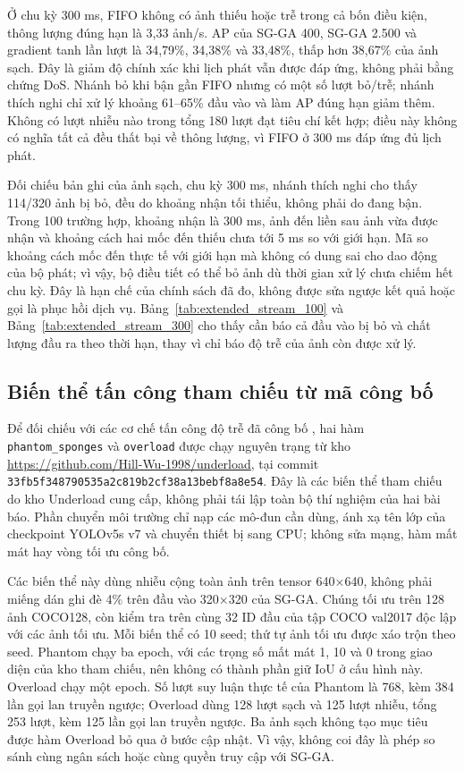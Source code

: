 \documentclass[a4paper,fleqn]{cas-dc}
\begin{document}
Ở chu kỳ 300 ms, FIFO không có ảnh thiếu hoặc trễ trong cả bốn điều kiện, thông lượng đúng hạn là 3,33 ảnh/s. AP của SG-GA 400, SG-GA 2.500 và gradient tanh lần lượt là 34,79\%, 34,38\% và 33,48\%, thấp hơn 38,67\% của ảnh sạch. Đây là giảm độ chính xác khi lịch phát vẫn được đáp ứng, không phải bằng chứng DoS. Nhánh bỏ khi bận gần FIFO nhưng có một số lượt bỏ/trễ; nhánh thích nghi chỉ xử lý khoảng 61--65\% đầu vào và làm AP đúng hạn giảm thêm. Không có lượt nhiễu nào trong tổng 180 lượt đạt tiêu chí kết hợp; điều này không có nghĩa tất cả đều thất bại về thông lượng, vì FIFO ở 300 ms đáp ứng đủ lịch phát.

Đối chiếu bản ghi của ảnh sạch, chu kỳ 300 ms, nhánh thích nghi cho thấy 114/320 ảnh bị bỏ, đều do khoảng nhận tối thiểu, không phải do đang bận. Trong 100 trường hợp, khoảng nhận là 300 ms, ảnh đến liền sau ảnh vừa được nhận và khoảng cách hai mốc đến thiếu chưa tới 5 ms so với giới hạn. Mã so khoảng cách mốc đến thực tế với giới hạn mà không có dung sai cho dao động của bộ phát; vì vậy, bộ điều tiết có thể bỏ ảnh dù thời gian xử lý chưa chiếm hết chu kỳ. Đây là hạn chế của chính sách đã đo, không được sửa ngược kết quả hoặc gọi là phục hồi dịch vụ. Bảng~\ref{tab:extended_stream_100} và Bảng~\ref{tab:extended_stream_300} cho thấy cần báo cả đầu vào bị bỏ và chất lượng đầu ra theo thời hạn, thay vì chỉ báo độ trễ của ảnh còn được xử lý.


\subsection{Biến thể tấn công tham chiếu từ mã công bố}
\label{sec:extended_reference}

Để đối chiếu với các cơ chế tấn công độ trễ đã công bố \cite{shapira2023,chen2024overload}, hai hàm \texttt{phantom\_sponges} và \texttt{overload} được chạy nguyên trạng từ kho \url{https://github.com/Hill-Wu-1998/underload}, tại commit \texttt{33fb5f348790535a2c819b2cf38a13bebf8a8e54}. Đây là các biến thể tham chiếu do kho Underload cung cấp, không phải tái lập toàn bộ thí nghiệm của hai bài báo. Phần chuyển môi trường chỉ nạp các mô-đun cần dùng, ánh xạ tên lớp của checkpoint YOLOv5s v7 và chuyển thiết bị sang CPU; không sửa mạng, hàm mất mát hay vòng tối ưu công bố.

Các biến thể này dùng nhiễu cộng toàn ảnh trên tensor 640×640, không phải miếng dán ghi đè 4\% trên đầu vào 320×320 của SG-GA. Chúng tối ưu trên 128 ảnh COCO128, còn kiểm tra trên cùng 32 ID đầu của tập COCO val2017 độc lập với các ảnh tối ưu. Mỗi biến thể có 10 seed; thứ tự ảnh tối ưu được xáo trộn theo seed. Phantom chạy ba epoch, với các trọng số mất mát 1, 10 và 0 trong giao diện của kho tham chiếu, nên không có thành phần giữ IoU ở cấu hình này. Overload chạy một epoch. Số lượt suy luận thực tế của Phantom là 768, kèm 384 lần gọi lan truyền ngược; Overload dùng 128 lượt sạch và 125 lượt nhiễu, tổng 253 lượt, kèm 125 lần gọi lan truyền ngược. Ba ảnh sạch không tạo mục tiêu được hàm Overload bỏ qua ở bước cập nhật. Vì vậy, không coi đây là phép so sánh cùng ngân sách hoặc cùng quyền truy cập với SG-GA.
\end{document}
